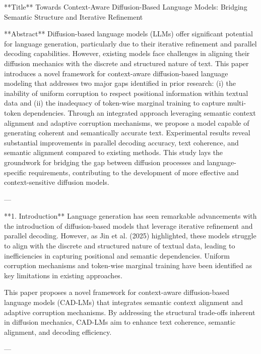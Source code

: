 **Title**  
Towards Context-Aware Diffusion-Based Language Models: Bridging Semantic Structure and Iterative Refinement  

**Abstract**  
Diffusion-based language models (LLMs) offer significant potential for language generation, particularly due to their iterative refinement and parallel decoding capabilities. However, existing models face challenges in aligning their diffusion mechanics with the discrete and structured nature of text. This paper introduces a novel framework for context-aware diffusion-based language modeling that addresses two major gaps identified in prior research: (i) the inability of uniform corruption to respect positional information within textual data and (ii) the inadequacy of token-wise marginal training to capture multi-token dependencies. Through an integrated approach leveraging semantic context alignment and adaptive corruption mechanisms, we propose a model capable of generating coherent and semantically accurate text. Experimental results reveal substantial improvements in parallel decoding accuracy, text coherence, and semantic alignment compared to existing methods. This study lays the groundwork for bridging the gap between diffusion processes and language-specific requirements, contributing to the development of more effective and context-sensitive diffusion models.  

---

**1. Introduction**  
Language generation has seen remarkable advancements with the introduction of diffusion-based models that leverage iterative refinement and parallel decoding. However, as Jin et al. (2025) highlighted, these models struggle to align with the discrete and structured nature of textual data, leading to inefficiencies in capturing positional and semantic dependencies. Uniform corruption mechanisms and token-wise marginal training have been identified as key limitations in existing approaches.

This paper proposes a novel framework for context-aware diffusion-based language models (CAD-LMs) that integrates semantic context alignment and adaptive corruption mechanisms. By addressing the structural trade-offs inherent in diffusion mechanics, CAD-LMs aim to enhance text coherence, semantic alignment, and decoding efficiency.

---

